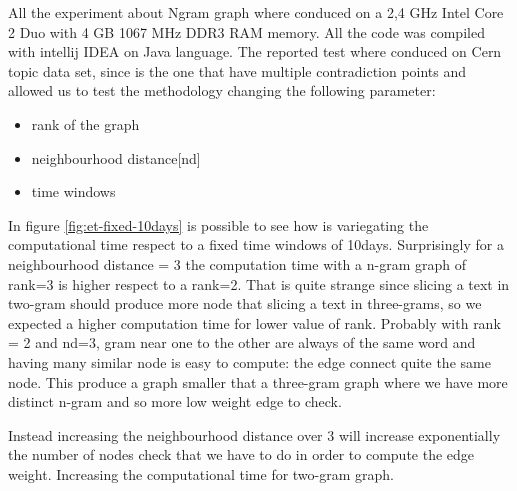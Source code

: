 All the experiment about Ngram graph where conduced on a 2,4 GHz Intel Core 2 Duo with 4 GB 1067 MHz DDR3 RAM memory.
 All the code was compiled with intellij IDEA on Java language. 
The reported test where conduced on Cern topic data set, since is the one that have multiple contradiction points and allowed us to test the methodology changing the following parameter:
\begin{itemize}
	\item rank of the graph
	\item neighbourhood distance[nd]
	\item time windows
\end{itemize}

In figure \ref{fig:et-fixed-10days} is possible to see how is variegating the computational time respect to a fixed time windows of 10days.
Surprisingly for a neighbourhood distance = 3 the computation time with a n-gram graph of rank=3 is higher respect to a rank=2. 
That is quite strange since slicing a text in two-gram should produce more node that slicing a text in three-grams, so we expected a higher computation time for lower value of rank.
Probably with rank = 2 and nd=3, gram near one to the other are always of the same word and having many similar node is easy to compute: the edge connect quite the same node.
This produce a graph smaller that a three-gram graph where we have more distinct n-gram and so more low weight edge to check.

Instead increasing the neighbourhood distance over 3 will increase exponentially the number of nodes check that we have to do in order to compute the edge weight. Increasing the computational time for two-gram graph.



